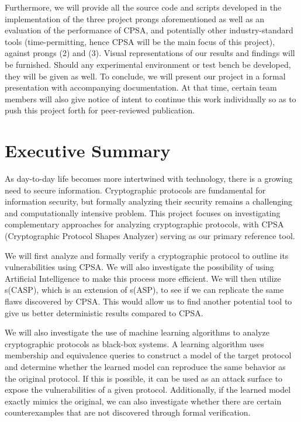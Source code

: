 \documentclass[11pt]{article}
\begin{document}
Furthermore, we will provide all the source code and scripts developed in the implementation of the three project prongs aforementioned as well as an evaluation of the performance of CPSA, and potentially other industry-standard tools (time-permitting, hence CPSA will be the main focus of this project), against prongs (2) and (3). Visual representations of our results and findings will be furnished. Should any experimental environment or test bench be developed, they will be given as well. To conclude, we will present our project in a formal presentation with accompanying documentation. At that time, certain team members will also give notice of intent to continue this work individually so as to push this project forth for peer-reviewed publication. 

\section{Executive Summary}

As day-to-day life becomes more intertwined with technology, there is a growing need to secure information. Cryptographic protocols are fundamental for information security, but formally analyzing their security remains a challenging and computationally intensive problem. This project focuses on investigating complementary approaches for analyzing cryptographic protocols, with CPSA (Cryptographic Protocol Shapes Analyzer) serving as our primary reference tool. 

We will first analyze and formally verify a cryptographic protocol to outline its vulnerabilities using CPSA. We will also investigate the possibility of using Artificial Intelligence to make this process more efficient. We will then utilize s(CASP), which is an extension of s(ASP), to see if we can replicate the same flaws discovered by CPSA. This would allow us to find another potential tool to give us better deterministic results compared to CPSA.

We will also investigate the use of machine learning algorithms to analyze cryptographic protocols as black-box systems. A learning algorithm uses membership and equivalence queries to construct a model of the target protocol and determine whether the learned model can reproduce the same behavior as the original protocol. If this is possible, it can be used as an attack surface to expose the vulnerabilities of a given protocol. Additionally, if the learned model exactly mimics the original, we can also investigate whether there are certain counterexamples that are not discovered through formal verification. 
\end{document}
